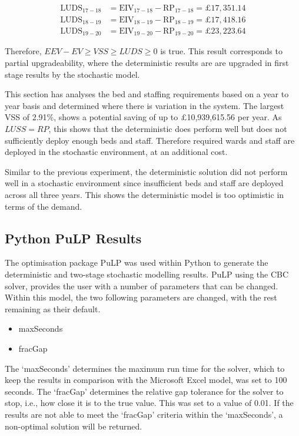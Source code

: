 \documentclass[../thesis.tex]{subfiles}
\begin{document}
\begin{align}
    \text{LUDS}_{17-18} &= \text{EIV}_{17-18} - \text{RP}_{17-18} = \pounds17,351.14\\
    \text{LUDS}_{18-19} &= \text{EIV}_{18-19} - \text{RP}_{18-19} = \pounds17,418.16   \\
    \text{LUDS}_{19-20} &= \text{EIV}_{19-20} - \text{RP}_{19-20} = \pounds23,223.64 
\end{align}

Therefore, $EEV-EV \geq VSS \geq LUDS \geq 0$ is true. This result corresponds to partial upgradeability, where the deterministic results are are upgraded in first stage results by the stochastic model.

This section has analyses the bed and staffing requirements based on a year to year basis and determined where there is variation in the system. The largest VSS of 2.91\%, shows a potential saving of up to $\pounds$10,939,615.56 per year. As $LUSS=RP$, this shows that the deterministic does perform well but does not sufficiently deploy enough beds and staff. Therefore required wards and staff are deployed in the stochastic environment, at an additional cost.

Similar to the previous experiment, the deterministic solution did not perform well in a stochastic environment since insufficient beds and staff are deployed across all three years. This shows the deterministic model is too optimistic in terms of the demand.


\subsection{Python PuLP Results}\label{sec:pulpresults}
The optimisation package PuLP \cite{Mitchell2019} was used within Python to generate the deterministic and two-stage stochastic modelling results. PuLP using the CBC solver, provides the user with a number of parameters that can be changed. Within this model, the two following parameters are changed, with the rest remaining as their default.
\begin{itemize}
    \item maxSeconds
    \item fracGap
\end{itemize}

The `maxSeconds' determines the maximum run time for the solver, which to keep the results in comparison with the Microsoft Excel model, was set to 100 seconds. The `fracGap' determines the relative gap tolerance for the solver to stop, i.e., how close it is to the true value. This was set to a value of 0.01. If the results are not able to meet the `fracGap' criteria within the `maxSeconds', a non-optimal solution will be returned.
\end{document}
